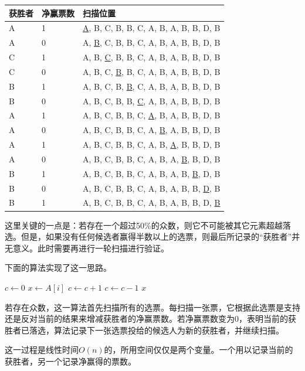 \documentclass[UTF8]{article}
\begin{document}
\begin{tabular}{|l|l|l|}
\hline
获胜者 & 净赢票数 & 扫描位置 \\
\hline
A & 1 & \underline{A}, B, C, B, B, C, A, B, A, B, B, D, B \\
A & 0 & A, \underline{B}, C, B, B, C, A, B, A, B, B, D, B \\
C & 1 & A, B, \underline{C}, B, B, C, A, B, A, B, B, D, B \\
C & 0 & A, B, C, \underline{B}, B, C, A, B, A, B, B, D, B \\
B & 1 & A, B, C, B, \underline{B}, C, A, B, A, B, B, D, B \\
B & 0 & A, B, C, B, B, \underline{C}, A, B, A, B, B, D, B \\
A & 1 & A, B, C, B, B, C, \underline{A}, B, A, B, B, D, B \\
A & 0 & A, B, C, B, B, C, A, \underline{B}, A, B, B, D, B \\
A & 1 & A, B, C, B, B, C, A, B, \underline{A}, B, B, D, B \\
A & 0 & A, B, C, B, B, C, A, B, A, \underline{B}, B, D, B \\
B & 1 & A, B, C, B, B, C, A, B, A, B, \underline{B}, D, B \\
B & 0 & A, B, C, B, B, C, A, B, A, B, B, \underline{D}, B \\
B & 1 & A, B, C, B, B, C, A, B, A, B, B, D, \underline{B} \\
\hline
\end{tabular}

这里关键的一点是：若存在一个超过50\%的众数，则它不可能被其它元素超越落选。但是，如果没有任何候选者赢得半数以上的选票，则最后所记录的“获胜者”并无意义。此时需要再进行一轮扫描进行验证。

下面的算法实现了这一思路。

\begin{algorithmic}[1]
  \State $c \gets 0$
      \State $x \gets A[i]$
    \EndIf
      \State $c \gets c + 1$
    \Else
      \State $c \gets c - 1$
    \EndIf
  \EndFor
  \State \Return $x$
\EndFunction
\end{algorithmic}

若存在众数，这一算法首先扫描所有的选票。每扫描一张票，它根据此选票是支持还是反对当前的结果来增减获胜者的净赢票数。若净赢票数变为0，表明当前的获胜者已落选，算法记录下一张选票投给的候选人为新的获胜者，并继续扫描。

这一过程是线性时间$O(n)$的，所用空间仅仅是两个变量。一个用以记录当前的获胜者，另一个记录净赢得的票数。
\end{document}
